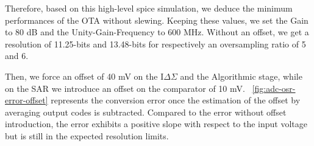 Therefore, based on this high-level spice simulation, we deduce the minimum performances of the OTA without slewing. Keeping these values, we set the Gain to 80 dB and the Unity-Gain-Frequency to 600 MHz. Without an offset, we get a resolution of 11.25-bits and 13.48-bits for respectively an oversampling ratio of 5 and 6.

Then, we force an offset of 40 mV on the I\(\Delta\Sigma\) and the Algorithmic stage, while on the SAR we introduce an offset on the comparator of 10 mV. \figurename~\ref{fig:adc-osr-error-offset} represents the conversion error once the estimation of the offset by averaging output codes is subtracted. Compared to the error without offset introduction, the error exhibits a positive slope with respect to the input voltage but is still in the expected resolution limits.

